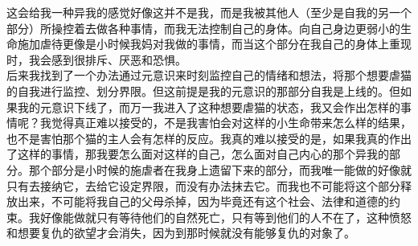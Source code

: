 {{		这会给我一种异我的感觉\pozhehao{}好像这并不是我，而是我被其他人（至少是自我的另一个部分）所操控着去做各种事情，而我无法控制自己的身体。向自己身边更弱小的生命施加虐待更像是小时候我妈对我做的事情，而当这个部分在我自己的身体上重现时，我会感到很排斥、厌恶和恐惧。\\
		后来我找到了一个办法\pozhehao{}通过元意识来时刻监控自己的情绪和想法，将那个想要虐猫的自我进行监控、划分界限。但这前提是我的元意识的那部分自我是上线的。但如果我的元意识下线了，而万一我进入了这种想要虐猫的状态，我又会作出怎样的事情呢？我觉得真正难以接受的，不是我害怕会对这样的小生命带来怎么样的结果，也不是害怕那个猫的主人会有怎样的反应。我真的难以接受的是，如果我真的作出了这样的事情，那我要怎么面对这样的自己，怎么面对自己内心的那个异我的部分。那个部分是小时候的施虐者在我身上遗留下来的部分，而我唯一能做的好像就只有去接纳它，去给它设定界限，而没有办法抹去它。而我也不可能将这个部分释放出来，不可能将我自己的父母杀掉，因为毕竟还有这个社会、法律和道德的约束。我好像能做就只有等待他们的自然死亡，只有等到他们的人不在了，这种愤怒和想要复仇的欲望才会消失，因为到那时候就没有能够复仇的对象了。}
}
